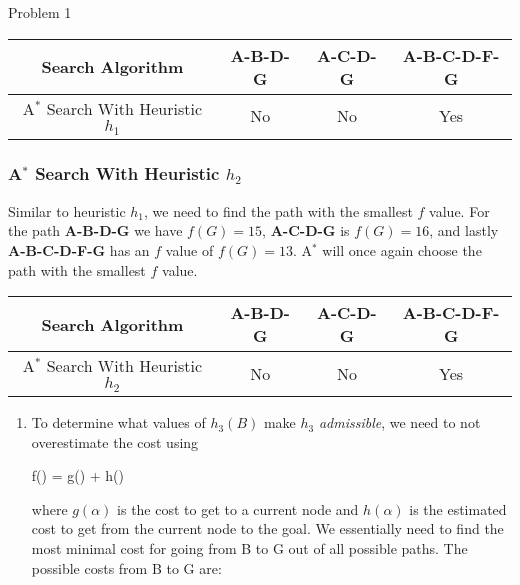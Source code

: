 \begin{problem}{Problem 1}
\begin{highlight}
        \begin{center}
            \begin{tabular}[h]{|c|c|c|c|}
                \hline Search Algorithm & \textbf{A-B-D-G} & \textbf{A-C-D-G} & \textbf{A-B-C-D-F-G} \\ \hline
                A$^{*}$ Search With Heuristic $h_{1}$ & No & No & Yes \\ \hline
            \end{tabular}   
        \end{center}

        \subsubsection*{A$^{*}$ Search With Heuristic $h_{2}$}

        Similar to heuristic $h_{1}$, we need to find the path with the smallest $f$ value. For the path \textbf{A-B-D-G} we have $f(G) = 15$, \textbf{A-C-D-G} is $f(G) = 16$, and lastly \textbf{A-B-C-D-F-G}
        has an $f$ value of $f(G) = 13$. A$^{*}$ will once again choose the path with the smallest $f$ value.

        \begin{center}
            \begin{tabular}[h]{|c|c|c|c|}
                \hline Search Algorithm & \textbf{A-B-D-G} & \textbf{A-C-D-G} & \textbf{A-B-C-D-F-G} \\ \hline
                A$^{*}$ Search With Heuristic $h_{2}$ & No & No & Yes \\ \hline
            \end{tabular}   
        \end{center}
    \end{highlight}

    \clearpage

    \begin{highlight}
        \begin{enumerate}[label = {\textbf{(\roman*)}}]
            \item To determine what values of $h_{3}(B)$ make $h_{3}$ \textit{admissible}, we need to not overestimate the cost using
            
            \begin{center}
                \begin{highlightbox}
                    f(\alpha) = g(\alpha) + h(\alpha)
                \end{highlightbox}
            \end{center}
            where $g(\alpha)$ is the cost to get to a current node and $h(\alpha)$ is the estimated cost to get from the current node to the goal. We essentially need to find the most minimal cost for
            going from B to G out of all possible paths. The possible costs from B to G are: 


\end{enumerate}
\end{highlight}
\end{problem}

